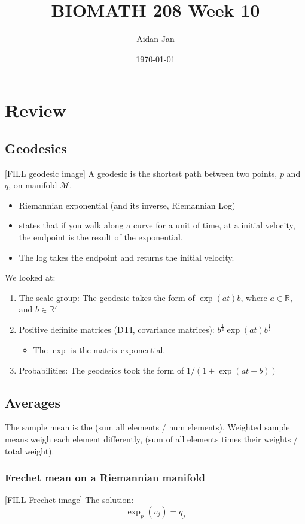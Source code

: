 \documentclass[10pt]{article}
\title{BIOMATH 208 Week 10}
\author{Aidan Jan}
\date{\today}
\newcommand{\R}{\mathbb{R}}
\begin{document}
\maketitle

\section*{Review}
\subsection*{Geodesics}
[FILL geodesic image]
A geodesic is the shortest path between two points, $p$ and $q$, on manifold $\mathcal{M}$.
\begin{itemize}
	\item Riemannian exponential (and its inverse, Riemannian Log)
	\item states that if you walk along a curve for a unit of time, at a initial velocity, the endpoint is the result of the exponential.
	\item The log takes the endpoint and returns the initial velocity.
\end{itemize}
We looked at:
\begin{enumerate}
    \item The scale group: The geodesic takes the form of $\exp(at)b$, where $a \in \R$, and $b \in \R'$
    \item Positive definite matrices (DTI, covariance matrices): $b^{\frac{1}{2}} \exp(at)b^{\frac{1}{2}}$
    \begin{itemize}
        \item The $\exp$ is the matrix exponential.
    \end{itemize}
    \item Probabilities:  The geodesics took the form of $1 / (1 + \exp(at + b))$
\end{enumerate}

\subsection*{Averages}
The sample mean is the (sum all elements / num elements).  Weighted sample means weigh each element differently, (sum of all elements times their weights / total weight).

\subsubsection*{Frechet mean on a Riemannian manifold}
[FILL Frechet image]
The solution:
\[\exp_p(v_j) = q_j\]
\end{document}
